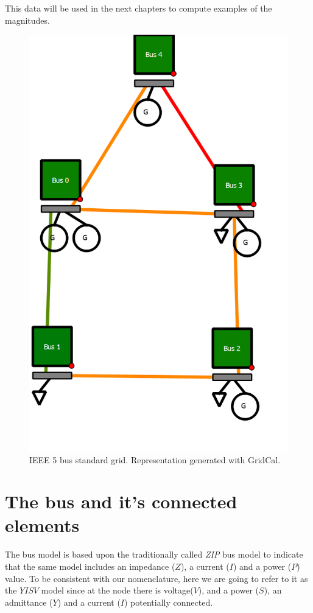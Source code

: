 \documentclass[nols,a4paper,twoside,notoc,fleqn]{tufte-book}
\begin{document}
This data will be used in the next chapters to compute examples of the magnitudes.


\begin{figure}[h!]
	\centering
	\includegraphics[width=0.7\linewidth]{img/IEEE5.png}
	\caption{IEEE 5 bus standard grid. Representation generated with GridCal.}
	\label{fig:IEEE5}
\end{figure}

\chapter{The bus and it's connected elements}

The bus model is based upon the traditionally called \textit{ZIP} bus model to indicate that the same model includes an impedance ($Z$), a current ($I$) and a power ($P$) value. To be consistent with our nomenclature, here we are going to refer to it as the $YISV$ model since at the node there is voltage($V$), and a power ($S$), an admittance ($Y$) and a current ($I$) potentially connected.
\end{document}

